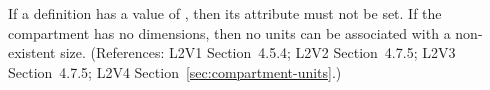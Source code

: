 If a \Compartment definition has a  value
of , then its  attribute must not be set. If the
compartment has no dimensions, then no units can be associated
with a non-existent size.  (References: L2V1 Section~4.5.4;
L2V2 Section~4.7.5; L2V3 Section~4.7.5; L2V4 Section~\ref{sec:compartment-units}.)
